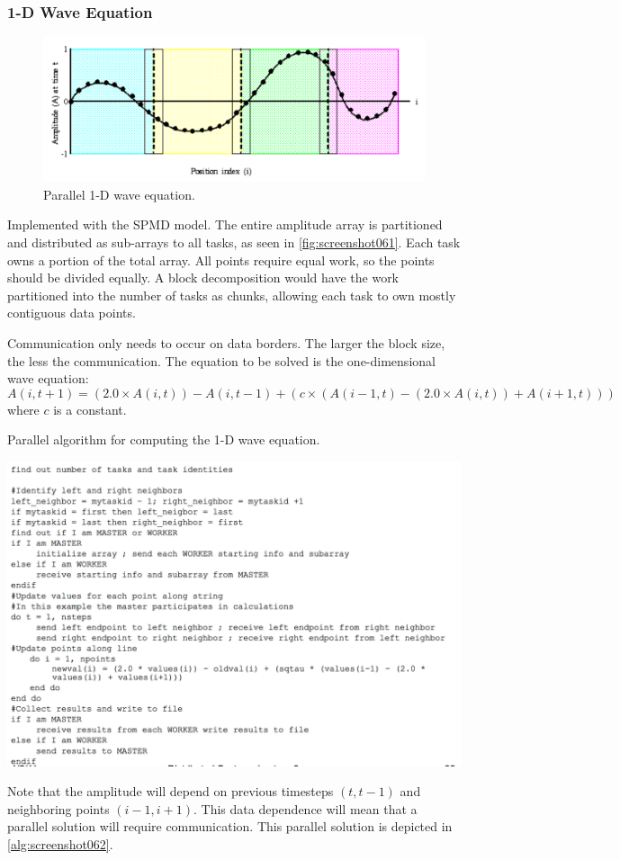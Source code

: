 \subsubsection{1-D Wave Equation}
\begin{figure}
\centering
\includegraphics[width=0.7\linewidth]{figures/screenshot061}
\caption{Parallel 1-D wave equation.}
\label{fig:screenshot061}
\end{figure}

Implemented with the SPMD model. The entire amplitude array is partitioned and distributed as sub-arrays to all tasks, as seen in \autoref{fig:screenshot061}. Each task owns a portion of the total array. All points require equal work, so the points should be divided equally. A block decomposition would have the work partitioned into the number of tasks as chunks, allowing each task to own mostly contiguous data points. 

Communication only needs to occur on data borders. The larger the block size, the less the communication. The equation to be solved is the one-dimensional wave equation:  
\[ A(i, t+1) = (2.0 \times A(i, t)) - A(i, t-1) + (c \times (A(i-1, t) - (2.0 \times A(i, t)) + A(i+1, t))) \]
where $c$ is a constant.

\begin{algorithm}[h]
\caption{Parallel algorithm for computing the 1-D wave equation. \footnotemark}
\label{alg:screenshot062}
\includegraphics[width=\linewidth]{figures/screenshot062}
\end{algorithm}

Note that the amplitude will depend on previous timesteps $(t, t-1)$ and neighboring points $(i-1, i+1)$. This data dependence will mean that a parallel solution will require communication. This parallel solution is depicted in \autoref{alg:screenshot062}.
